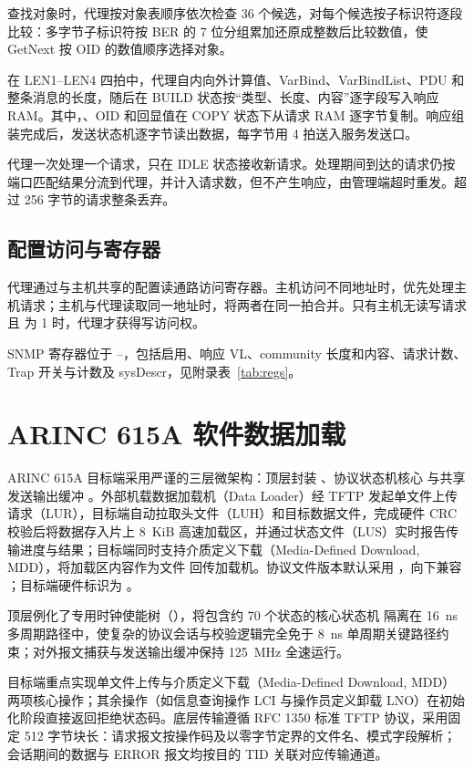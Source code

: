 查找对象时，代理按对象表顺序依次检查 36 个候选，对每个候选按子标识符逐段比较：多字节子标识符按 BER 的 7 位分组累加还原成整数后比较数值，使 GetNext 按 OID 的数值顺序选择对象。

在 LEN1--LEN4 四拍中，代理自内向外计算值、VarBind、VarBindList、PDU 和整条消息的长度，随后在 BUILD 状态按“类型、长度、内容”逐字段写入响应 RAM。其中，、OID 和回显值在 COPY 状态下从请求 RAM 逐字节复制。响应组装完成后，发送状态机逐字节读出数据，每字节用 4 拍送入服务发送口。

代理一次处理一个请求，只在 IDLE 状态接收新请求。处理期间到达的请求仍按端口匹配结果分流到代理，并计入请求数，但不产生响应，由管理端超时重发。超过 256 字节的请求整条丢弃。

\subsection{配置访问与寄存器}

代理通过与主机共享的配置读通路访问寄存器。主机访问不同地址时，优先处理主机请求；主机与代理读取同一地址时，将两者在同一拍合并。只有主机无读写请求且  为 1 时，代理才获得写访问权。

SNMP 寄存器位于 --，包括启用、响应 VL、community 长度和内容、请求计数、Trap 开关与计数及 sysDescr，见附录表~\ref{tab:regs}。

\section{ARINC 615A 软件数据加载}\label{sec:a615}
\begingroup
\setlength{\parskip}{0pt}

ARINC 615A 目标端采用严谨的三层微架构：顶层封装 、协议状态机核心  与共享发送输出缓冲 。外部机载数据加载机（Data Loader）经 TFTP 发起单文件上传请求（LUR），目标端自动拉取头文件（LUH）和目标数据文件，完成硬件 CRC 校验后将数据存入片上 8~KiB 高速加载区，并通过状态文件（LUS）实时报告传输进度与结果；目标端同时支持介质定义下载（Media-Defined Download, MDD），将加载区内容作为文件  回传加载机。协议文件版本默认采用 ，向下兼容 ；目标端硬件标识为 。

 顶层例化了专用时钟使能树（），将包含约 70 个状态的核心状态机  隔离在 16~ns 多周期路径中，使复杂的协议会话与校验逻辑完全免于 8~ns 单周期关键路径约束；对外报文捕获与发送输出缓冲保持 125~MHz 全速运行。

目标端重点实现单文件上传与介质定义下载（Media-Defined Download, MDD）两项核心操作；其余操作（如信息查询操作 LCI 与操作员定义卸载 LNO）在初始化阶段直接返回拒绝状态码。底层传输遵循 RFC 1350 标准 TFTP 协议，采用固定 512 字节块长：请求报文按操作码及以零字节定界的文件名、模式字段解析；会话期间的数据与 ERROR 报文均按目的 TID 关联对应传输通道。

